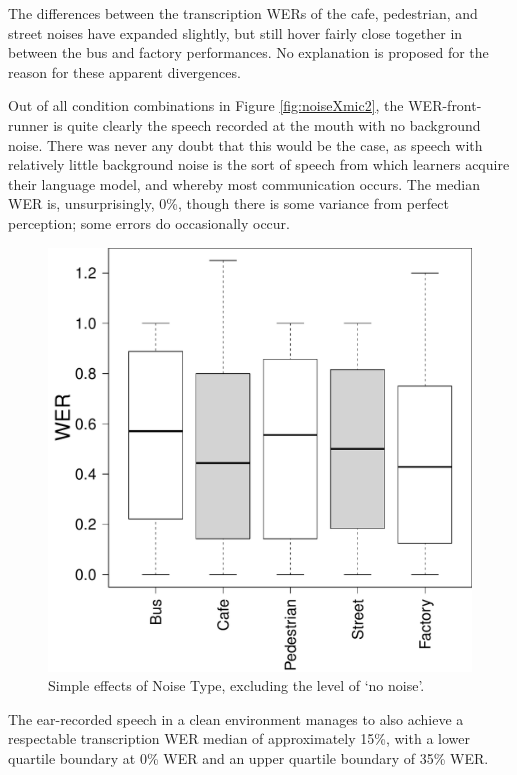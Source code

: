 \documentclass[dissertation,copyright]{uathesis}
\makeatletter
\def\maxwidth{ %
  \ifdim\Gin@nat@width>\linewidth
    \linewidth
  \else
    \Gin@nat@width
  \fi
}
\makeatother
\begin{document}
The differences between the transcription WERs of the cafe, pedestrian, and street noises have expanded slightly, but still hover fairly close together in between the bus and factory performances. No explanation is proposed for the reason for these apparent divergences.

Out of all condition combinations in Figure \ref{fig:noiseXmic2}, the WER-front-runner is quite clearly the speech recorded at the mouth with no background noise.  There was never any doubt that this would be the case, as speech with relatively little background noise is the sort of speech from which learners acquire their language model, and whereby most communication occurs.  The median WER is, unsurprisingly, 0\%, though there is some variance from perfect perception; some errors do occasionally occur. 
%
\begin{figure}

\includegraphics[width=\maxwidth]{figure/Noise-type_simple-1} 

\caption{Simple effects of Noise Type, excluding the level of `no noise'.}
\label{fig:noise-type_non-no-noise_main}
\end{figure}
%
The ear-recorded speech in a clean environment manages to also achieve a respectable transcription WER median of approximately 15\%, with a lower quartile boundary at 0\% WER and an upper quartile boundary of 35\% WER.
\end{document}
